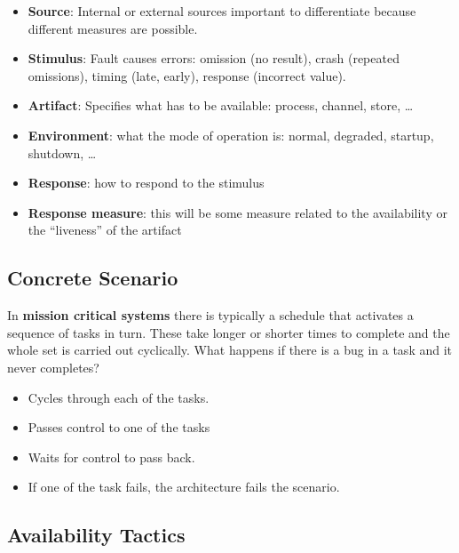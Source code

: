 \documentclass[a4paper]{article}
\begin{document}
\begin{itemize}
\item{\textbf{Source}: Internal or external sources important to differentiate because different measures are possible.}
\item{\textbf{Stimulus}: Fault causes errors: omission (no result), crash (repeated omissions), timing (late, early), response (incorrect value).}
\item{\textbf{Artifact}: Specifies what has to be available: process, channel, store, …}
\item{\textbf{Environment}: what the mode of operation is: normal, degraded, startup, shutdown, …}
\item{\textbf{Response}:  how to respond to the stimulus }
\item{\textbf{Response measure}: this will be some measure related to the availability or the “liveness” of the artifact}
\end{itemize}

\subsection{Concrete Scenario}

In \textbf{mission critical systems} there is typically a schedule that activates a sequence of tasks in turn.  These take longer or shorter times to complete and the whole set is carried out cyclically. What happens if there is a bug in a task and it never completes?

\begin{itemize}
\item{Cycles through each of the tasks.}
\item{Passes control to one of the tasks}
\item{Waits for control to pass back.}
\item{If one of the task fails, the architecture fails the scenario.}
\end{itemize}


\subsection{Availability Tactics}
\end{document}
